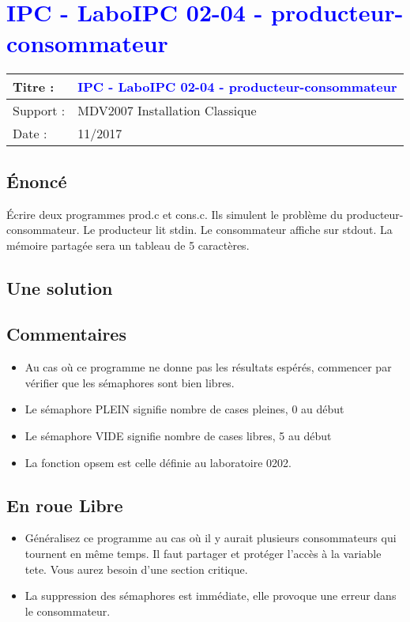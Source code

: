 
\renewcommand{\titre}{\textcolor{blue}{ IPC - LaboIPC 02-04 - producteur-consommateur}}

\lhead{ \titre }
\section{{\titre} }

\begin{tabular}{|l|l|}
\hline
Titre : 	& \titre \\\hline
Support : 	& MDV2007 Installation Classique \\\hline
Date :		& 11/2017 \\\hline
\end{tabular}

\subsection{Énoncé}

Écrire deux programmes prod.c et cons.c. Ils simulent le problème du producteur-consommateur. Le producteur lit stdin. Le consommateur affiche sur stdout.
La mémoire partagée sera un tableau de 5 caractères.

\subsection{Une solution}




\subsection{Commentaires}

\begin{itemize}
\item Au cas où ce programme ne donne pas les résultats espérés, commencer par vérifier que les sémaphores sont bien libres.
\item Le sémaphore PLEIN signifie nombre de cases pleines, 0 au début
\item Le sémaphore VIDE signifie nombre de cases libres, 5 au début
\item La fonction opsem est celle définie au laboratoire 0202.
\end{itemize}

\subsection{En roue Libre}

\begin{itemize}
\item Généralisez ce programme au cas où il y aurait plusieurs consommateurs qui tournent en même temps. Il faut partager et protéger l'accès à la variable tete. Vous aurez besoin d'une section critique.
\item La suppression des sémaphores est immédiate, elle provoque une erreur dans le consommateur.
\end{itemize}
\newpage
